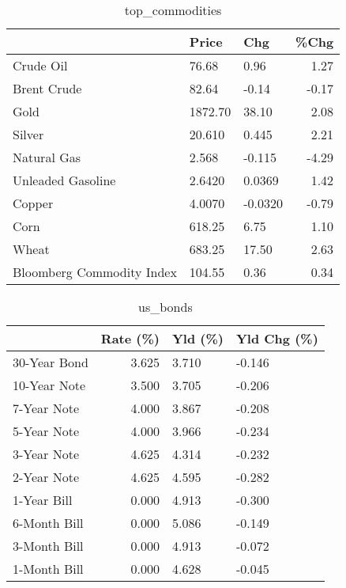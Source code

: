 \documentclass{article}%
\begin{document}
\begin{table}[htbp]%
\caption{top\_commodities}%
\centering%
\begin{adjustbox}{width=1\textwidth}%
\begin{tabular}{lllr}
\toprule
                          &   Price &     Chg &  \%Chg \\
\midrule
               Crude Oil  &   76.68 &    0.96 &  1.27 \\
             Brent Crude  &   82.64 &   -0.14 & -0.17 \\
                    Gold  & 1872.70 &   38.10 &  2.08 \\
                  Silver  &  20.610 &   0.445 &  2.21 \\
             Natural Gas  &   2.568 &  -0.115 & -4.29 \\
       Unleaded Gasoline  &  2.6420 &  0.0369 &  1.42 \\
                  Copper  &  4.0070 & -0.0320 & -0.79 \\
                    Corn  &  618.25 &    6.75 &  1.10 \\
                   Wheat  &  683.25 &   17.50 &  2.63 \\
Bloomberg Commodity Index &  104.55 &    0.36 &  0.34 \\
\bottomrule
\end{tabular}
%
\end{adjustbox}%
\end{table}

%


\begin{table}[htbp]%
\caption{us\_bonds}%
\centering%
\begin{adjustbox}{width=1\textwidth}%
\begin{tabular}{lrll}
\toprule
             &  Rate (\%) & Yld (\%) & Yld Chg (\%) \\
\midrule
30-Year Bond &     3.625 &   3.710 &      -0.146 \\
10-Year Note &     3.500 &   3.705 &      -0.206 \\
 7-Year Note &     4.000 &   3.867 &      -0.208 \\
 5-Year Note &     4.000 &   3.966 &      -0.234 \\
 3-Year Note &     4.625 &   4.314 &      -0.232 \\
 2-Year Note &     4.625 &   4.595 &      -0.282 \\
 1-Year Bill &     0.000 &   4.913 &      -0.300 \\
6-Month Bill &     0.000 &   5.086 &      -0.149 \\
3-Month Bill &     0.000 &   4.913 &      -0.072 \\
1-Month Bill &     0.000 &   4.628 &      -0.045 \\
\bottomrule
\end{tabular}
%
\end{adjustbox}%
\end{table}
\end{document}
